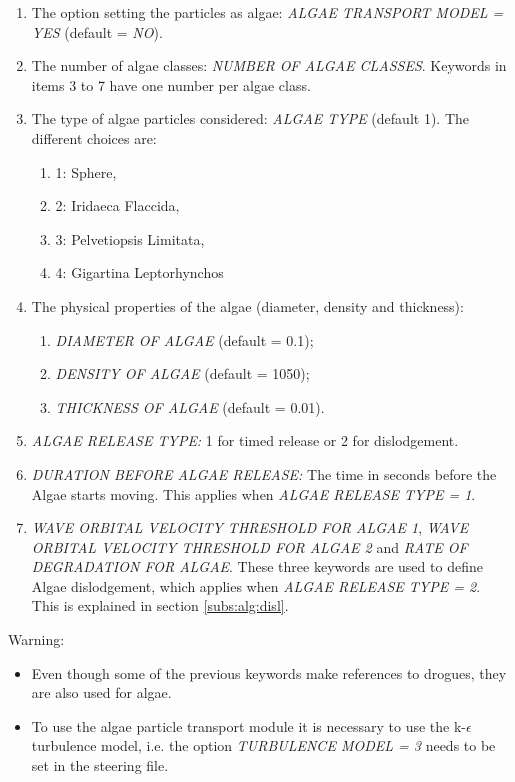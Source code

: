 \begin{enumerate}
\item  The option setting the particles as algae: \textit{ALGAE TRANSPORT MODEL = YES} (default = \textit{NO}).

\item  The number of algae classes: \textit{NUMBER OF ALGAE CLASSES}.  Keywords in items 3 to 7 have one number per algae class.

\item  The type of algae particles considered: \textit{ALGAE TYPE} (default 1).  The different choices are:

\begin{enumerate}
\item[\nonumber] 1: Sphere,
\item[\nonumber] 2: Iridaeca Flaccida,
\item[\nonumber] 3: Pelvetiopsis Limitata,
\item[\nonumber] 4: Gigartina Leptorhynchos
\end{enumerate}

\item  The physical properties of the algae (diameter, density and thickness):
\begin{enumerate}
\item[\nonumber] \textit{DIAMETER OF ALGAE} (default = 0.1);
\item[\nonumber] \textit{DENSITY OF ALGAE} (default = 1050);
\item[\nonumber] \textit{THICKNESS OF ALGAE} (default = 0.01).
\end{enumerate}

\item  \textit{ALGAE RELEASE TYPE:}  1 for timed release or 2 for dislodgement.

\item  \textit{DURATION BEFORE ALGAE RELEASE:}  The time in seconds before the Algae starts moving.  This applies when \textit{ALGAE RELEASE TYPE = 1}.

\item  \textit{WAVE ORBITAL VELOCITY THRESHOLD FOR ALGAE 1}, \textit{WAVE ORBITAL VELOCITY THRESHOLD FOR ALGAE 2} and \textit{RATE OF DEGRADATION FOR ALGAE}.  These three keywords are used to define Algae dislodgement, which applies when \textit{ALGAE RELEASE TYPE = 2}.  This is explained in section \ref{subs:alg:disl}.

\end{enumerate}

\begin{WarningBlock}{Warning:}

\begin{itemize}
\item  Even though some of the previous keywords make references to drogues, they are also used for algae.

\item  To use the algae particle transport module it is necessary to use the k-$\epsilon$ turbulence model, i.e. the option \textit{TURBULENCE MODEL = 3} needs to be set in the steering file.
\end{itemize}
\end{WarningBlock}

